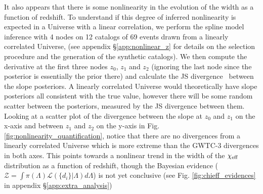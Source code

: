 \documentclass[%
 reprint,
 amsmath,amssymb,
 aps,
 prd,
]{revtex4-2}
\newcommand{\chieff}{\chi_{\rm eff}}
\begin{document}
It also appears that there is some nonlinearity in the evolution of the width as a function of redshift. To understand if this degree of inferred nonlinearity is expected in a Universe with a linear correlation, we perform the spline model inference with 4 nodes on 12 catalogs of 69 events drawn from a linearly correlated Universe, (see appendix \S \ref{app:nonlinear_z} for details on the selection procedure and the generation of the synthetic catalogs). We then compute the derivative at the first three nodes $z_0$, $z_1$ and $z_2$ (ignoring the last node since the posterior is essentially the prior there) and calculate the \acf{JS} divergence~\cite{kullback1951, Lin:1991zzm} between the slope posteriors. A linearly correlated Universe would theoretically have slope posteriors all consistent with the true value, however there will be some random scatter between the posteriors, measured by the \ac{JS} divergence between them. Looking at a scatter plot of the divergence between the slope at $z_0$ and $z_1$ on the x-axis and between $z_1$ and $z_2$ on the y-axis in Fig. \ref{fig:nonlinearity_quantification}, notice that there are no divergences from a linearly correlated Universe which is more extreme than the \ac{GWTC-3} divergences in both axes. This points towards a nonlinear trend in the width of the $\chieff$ distribution as a function of redshift, though the Bayesian evidence ($\mathcal{Z} = \int \pi(\Lambda) \mathcal{L}(\{d_i\}|\Lambda) d\Lambda$) is not yet conclusive (see Fig. \ref{fig:chieff_evidences} in appendix \S \ref{app:extra_analysis})



\end{document}
